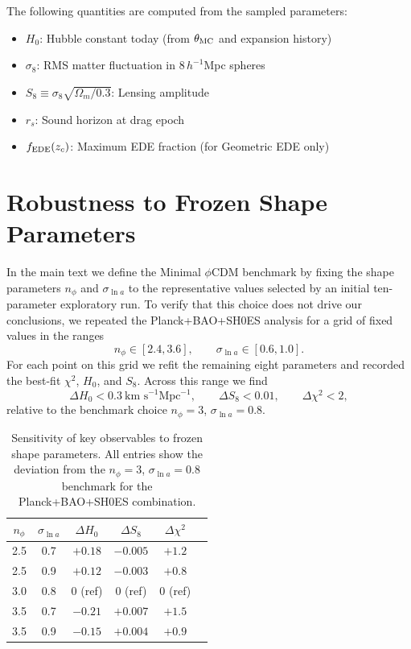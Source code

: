 \documentclass[a4paper,11pt]{article}
\begin{document}
The following quantities are computed from the sampled parameters:
\begin{itemize}
    \item $H_0$: Hubble constant today (from $\theta_{\rm MC}$ and expansion history)
    \item $\sigma_8$: RMS matter fluctuation in $8\,h^{-1}$Mpc spheres
    \item $S_8 \equiv \sigma_8\sqrt{\Omega_m/0.3}$: Lensing amplitude
    \item $r_s$: Sound horizon at drag epoch
    \item $f_{\rm EDE}(z_c)$: Maximum EDE fraction (for Geometric EDE only)
\end{itemize}


\section{Robustness to Frozen Shape Parameters}
\label{app:frozen_robustness}

In the main text we define the Minimal $\phi$CDM benchmark by fixing the shape parameters $n_\phi$ and $\sigma_{\ln a}$ to the representative values selected by an initial ten-parameter exploratory run. To verify that this choice does not drive our conclusions, we repeated the Planck+BAO+SH0ES analysis for a grid of fixed values in the ranges
\begin{equation}
n_\phi \in [2.4, 3.6], \qquad \sigma_{\ln a} \in [0.6, 1.0].
\end{equation}
For each point on this grid we refit the remaining eight parameters and recorded the best-fit $\chi^2$, $H_0$, and $S_8$. Across this range we find
\begin{equation}
\Delta H_0 < 0.3~\text{km s}^{-1}\text{Mpc}^{-1}, \qquad \Delta S_8 < 0.01, \qquad \Delta\chi^2 < 2,
\end{equation}
relative to the benchmark choice $n_\phi = 3$, $\sigma_{\ln a} = 0.8$.

\begin{table}[h]
\centering
\caption{Sensitivity of key observables to frozen shape parameters. All entries show the deviation from the $n_\phi=3$, $\sigma_{\ln a}=0.8$ benchmark for the Planck+BAO+SH0ES combination.}
\label{tab:frozen_robustness}
\begin{tabular}{cccccc}
\toprule
$n_\phi$ & $\sigma_{\ln a}$ & $\Delta H_0$ & $\Delta S_8$ & $\Delta\chi^2$ \\
\midrule
2.5 & 0.7 & $+0.18$ & $-0.005$ & $+1.2$ \\
2.5 & 0.9 & $+0.12$ & $-0.003$ & $+0.8$ \\
3.0 & 0.8 & 0 (ref) & 0 (ref) & 0 (ref) \\
3.5 & 0.7 & $-0.21$ & $+0.007$ & $+1.5$ \\
3.5 & 0.9 & $-0.15$ & $+0.004$ & $+0.9$ \\
\bottomrule
\end{tabular}
\end{table}
\end{document}
